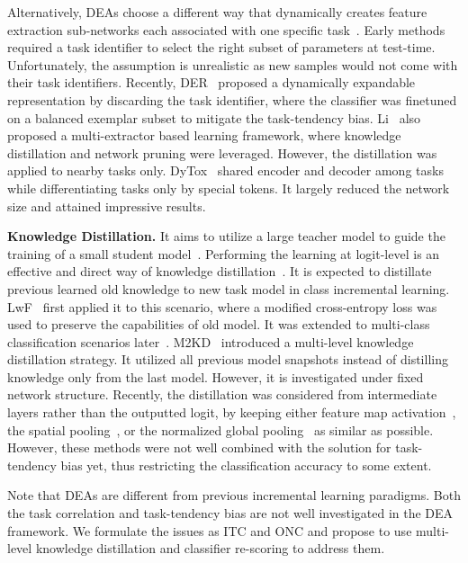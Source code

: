 \documentclass[letterpaper]{article} %
\begin{document}
Alternatively, DEAs choose a different way that dynamically creates feature extraction sub-networks each associated with one specific task~\cite{t23, t27, t33, t56, t11, t67}. Early methods required a task identifier to select the right subset of parameters at test-time. Unfortunately, the assumption is unrealistic as new samples would not come with their task identifiers. Recently, DER~\cite{t70} proposed a dynamically expandable representation by discarding the task identifier, where the classifier was finetuned on a balanced exemplar subset to mitigate the task-tendency bias. Li~\cite{t47} also proposed a multi-extractor based learning framework, where knowledge distillation and network pruning were leveraged. However, the distillation was applied to nearby tasks only. DyTox~\cite{t0} shared encoder and decoder among tasks while differentiating tasks only by special tokens. It largely reduced the network size and attained impressive results.


\noindent\textbf{Knowledge Distillation.}
It aims to utilize a large teacher model to guide the training of a small student model~\cite{r9,yang2022multi,yang2022rd}. Performing the learning at logit-level is an effective and direct way of knowledge distillation~\cite{e14}. It is expected to distillate previous learned old knowledge to new task model in class incremental learning. LwF~\cite{w20} first applied it to this scenario, where a modified cross-entropy loss was used to preserve the capabilities of old model. It was extended to multi-class classification scenarios later~\cite{t54}. M2KD~\cite{w39} introduced a multi-level knowledge distillation strategy. It utilized all previous model snapshots instead of distilling knowledge only from the last model. However, it is investigated under fixed network structure. Recently, the distillation was considered from intermediate layers rather than the outputted logit, by keeping either feature map activation~\cite{p24}, the spatial pooling~\cite{t19}, or the normalized global pooling~\cite{t32} as similar as possible. However, these methods were not well combined with the solution for task-tendency bias yet, thus restricting the classification accuracy to some extent.

Note that DEAs are different from previous incremental learning paradigms. Both the task correlation and task-tendency bias are not well investigated in the DEA framework. We formulate the issues as ITC and ONC and propose to use multi-level knowledge distillation and classifier re-scoring to address them.
\end{document}
